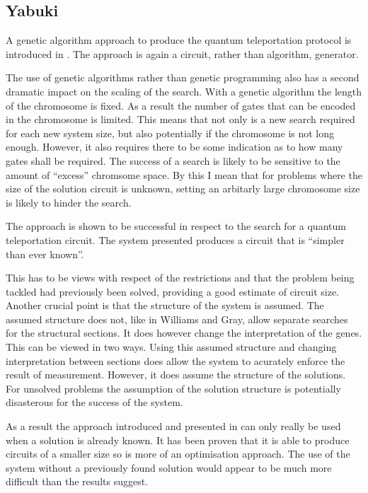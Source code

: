 \subsection{Yabuki}
A genetic algorithm approach to produce the quantum teleportation protocol is introduced in \cite{Yabuki00geneticalgorithms}.
The approach is again a circuit, rather than algorithm, generator.

The use of genetic algorithms rather than genetic programming also has a second dramatic impact on the scaling of the search.
With a genetic algorithm the length of the chromosome is fixed.
As a result the number of gates that can be encoded in the chromosome is limited.
This means that not only is a new search required for each new system size, but also potentially if the chromosome is not long enough.
However, it also requires there to be some indication as to how many gates shall be required.
The success of a search is likely to be sensitive to the amount of ``excess'' chromsome space.
By this I mean that for problems where the size of the solution circuit is unknown, setting an arbitarly large chromosome size is likely to hinder the search.

The approach is shown to be successful in respect to the search for a quantum teleportation circuit.
The system presented produces a circuit that is ``simpler than ever known''\cite{Yabuki00geneticalgorithms}.

This has to be views with respect of the restrictions and that the problem being tackled had previously been solved, providing a good estimate of circuit size.
Another crucial point is that the structure of the system is assumed.
The assumed structure does not, like in Williams and Gray\cite{Williams:1998:ADQ:645812.670824}, allow separate searches for the structural sections.
It does however change the interpretation of the genes.
This can be viewed in two ways.
Using this assumed structure and changing interpretation between sections does allow the system to acurately enforce the result of measurement.
However, it does assume the structure of the solutions.
For unsolved problems the assumption of the solution structure is potentially disasterous for the success of the system.

As a result the approach introduced and presented in \cite{Yabuki00geneticalgorithms} can only really be used when a solution is already known.
It has been proven that it is able to produce circuits of a smaller size so is more of an optimisation approach.
The use of the system without a previously found solution would appear to be much more difficult than the results suggest.

